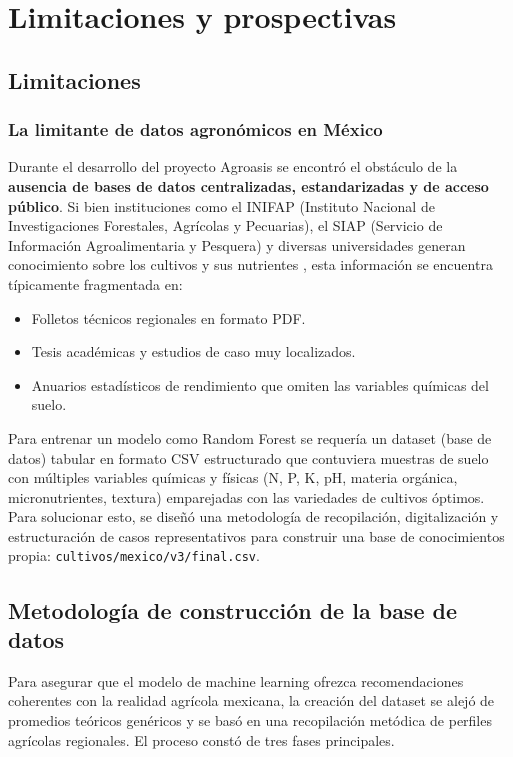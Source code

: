 \documentclass[12pt]{article}
\begin{document}
\section{Limitaciones y prospectivas}

\subsection{Limitaciones}

\subsubsection{La limitante de datos agronómicos en México}
Durante el desarrollo del proyecto Agroasis se encontró el obstáculo de la \textbf{ausencia de bases de datos centralizadas, estandarizadas y de acceso público}. Si bien instituciones como el INIFAP (Instituto Nacional de Investigaciones Forestales, Agrícolas y Pecuarias), el SIAP (Servicio de Información Agroalimentaria y Pesquera) y diversas universidades generan conocimiento sobre los cultivos y sus nutrientes \citep{siap_2022}, esta información se encuentra típicamente fragmentada en:

\begin{itemize}
    \item Folletos técnicos regionales en formato PDF.
    \item Tesis académicas y estudios de caso muy localizados.
    \item Anuarios estadísticos de rendimiento que omiten las variables químicas del suelo.
\end{itemize}

Para entrenar un modelo como Random Forest se requería un dataset (base de datos) tabular en formato CSV estructurado que contuviera muestras de suelo con múltiples variables químicas y físicas (N, P, K, pH, materia orgánica, micronutrientes, textura) emparejadas con las variedades de cultivos óptimos. Para solucionar esto, se diseñó una metodología de recopilación, digitalización y estructuración de casos representativos para construir una base de conocimientos propia: \texttt{cultivos/mexico/v3/final.csv}.

\subsection{Metodología de construcción de la base de datos}
Para asegurar que el modelo de machine learning ofrezca recomendaciones coherentes con la realidad agrícola mexicana, la creación del dataset se alejó de promedios teóricos genéricos y se basó en una recopilación metódica de perfiles agrícolas regionales. El proceso constó de tres fases principales.
\end{document}

